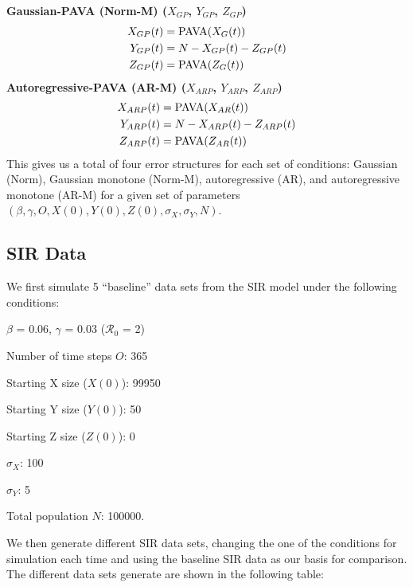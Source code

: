 \documentclass[12pt]{article}
\newcommand{\rr}{\ensuremath{\mathcal{R}_0}}
\begin{document}
\noindent \textbf{Gaussian-PAVA (Norm-M) ($X_{GP}$, $Y_{GP}$, $Z_{GP}$)}
\begin{align*}
 X_{GP}(t) &= \textnormal{PAVA}(X_G(t)) \\
  Y_{GP}(t) &= N - X_{GP}(t) - Z_{GP}(t) \\
  Z_{GP}(t) &= \textnormal{PAVA}(Z_G(t)) \\
\end{align*}
\textbf{Autoregressive-PAVA (AR-M) ($X_{ARP}$, $Y_{ARP}$, $Z_{ARP}$)}
\begin{align*}
  X_{ARP}(t) &= \textnormal{PAVA}(X_{AR}(t)) \\
  Y_{ARP}(t) &= N - X_{ARP}(t) - Z_{ARP}(t) \\
  Z_{ARP}(t) &= \textnormal{PAVA}(Z_{AR}(t)) 
\end{align*}
This gives us a total of four error structures for each set of conditions: Gaussian (Norm), Gaussian monotone (Norm-M), autoregressive (AR), and autoregressive monotone (AR-M) for a given set of parameters $(\beta, \gamma, O, X(0), Y(0), Z(0), \sigma_X, \sigma_Y, N)$.

\subsection{SIR Data}

We first simulate 5 ``baseline'' data sets from the SIR model under the following conditions: 

\begin{center}
	
	$\beta$ = 0.06, $\gamma$ = 0.03 ($\rr$ = 2)
	
	Number of time steps $O$: 365
	
	Starting X size ($X(0)$): 99950
	
	Starting Y size ($Y(0)$): 50
	
	Starting Z size ($Z(0)$): 0 
	
	$\sigma_X$: 100
	
	$\sigma_Y$: 5
	
	Total population $N$: 100000.
	
\end{center}

We then generate different SIR data sets, changing the one of the conditions for simulation each time and using the baseline SIR data as our basis for comparison. The different data sets generate are shown in the following table:
\end{document}
